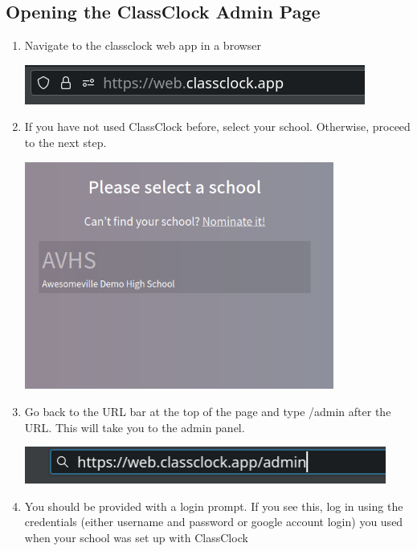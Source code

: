 \documentclass{article}
\begin{document}
\subsection{Opening the ClassClock Admin Page}
\begin{enumerate}
\item {Navigate to the classclock web app in a browser}
\begin{center}
\includegraphics[width=4.4055in,height=0.5102in]{Mini20Manual-img007.png}
\end{center}
\item {If you have not used ClassClock before, select your school. Otherwise, proceed to the next step.}
\begin{center}
\includegraphics[width=0.8\textwidth]{Mini20Manual-img008.png}
\end{center}
\item {Go back to the URL bar at the top of the page and type /admin after the URL. This will take you to the admin panel.}
\begin{center}
\includegraphics[width=4.6866in,height=0.4783in]{Mini20Manual-img009.png}
\end{center}
\item {You should be provided with a login prompt. If you see this, log in using the credentials (either username and password
or google account login) you used when your school was set up with ClassClock}


\end{enumerate}
\end{document}
